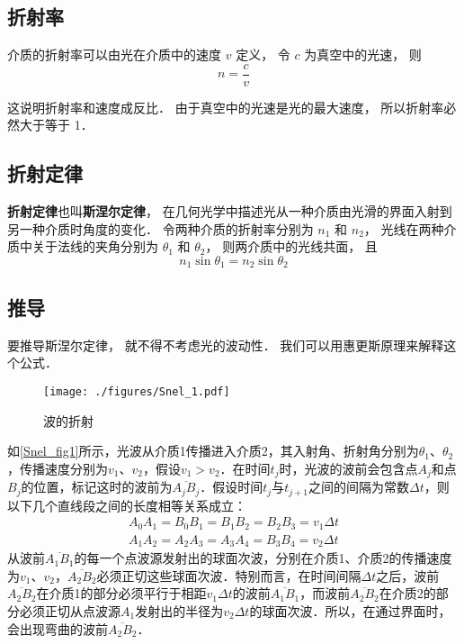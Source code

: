 
\subsection{折射率}
介质的折射率可以由光在介质中的速度 $v$ 定义， 令 $c$ 为真空中的光速， 则
\begin{equation}
n = \frac{c}{v}
\end{equation} 

这说明折射率和速度成反比． 由于真空中的光速是光的最大速度， 所以折射率必然大于等于 1．

\subsection{折射定律}

\textbf{折射定律}也叫\textbf{斯涅尔定律}， 在几何光学中描述光从一种介质由光滑的界面入射到另一种介质时角度的变化． 令两种介质的折射率分别为 $n_1$ 和 $n_2$， 光线在两种介质中关于法线的夹角分别为 $\theta_1$ 和 $\theta_2$， 则两介质中的光线共面， 且
\begin{equation}
n_1 \sin\theta_1 = n_2 \sin\theta_2
\end{equation}


\subsection{推导}
要推导斯涅尔定律， 就不得不考虑光的波动性． 我们可以用惠更斯原理来解释这个公式．
\begin{figure}[ht]
\centering
\texttt{[image: ./figures/Snel\_1.pdf]}
\caption{波的折射} \label{Snel_fig1}
\end{figure}
如\autoref{Snel_fig1}所示，光波从介质1传播进入介质2，其入射角、折射角分别为$\theta_1$、$\theta_2$，传播速度分别为$v_1$、$v_2$，假设$v_1>v_2$．在时间$t_{j}$时，光波的波前会包含点$A_{j}$和点$B_{j}$的位置，标记这时的波前为$\overline {A_{j}B_{j}}$．假设时间$t_{j}$与$t_{{j+1}}$之间的间隔为常数$\Delta t$，则以下几个直线段之间的长度相等关系成立：
\begin{equation}
\begin{aligned}
A_{0}A_{1}=B_{0}B_{1}=B_{1}B_{2}=B_{2}B_{3}=v_{1}\Delta t \\
A_{1}A_{2}=A_{2}A_{3}=A_{3}A_{4}=B_{3}B_{4}=v_{2}\Delta t
\end{aligned}
\end{equation}
从波前$\overline {A_{1}B_{1}}$的每一个点波源发射出的球面次波，分别在介质1、介质2的传播速度为$v_1$、$v_2$，$\overline {A_{2}B_{2}}$必须正切这些球面次波．特别而言，在时间间隔$\Delta t$之后，波前$\overline {A_{2}B_{2}}$在介质1的部分必须平行于相距$v_{1}\Delta t$的波前$\overline {A_{1}B_{1}}$，而波前$\overline {A_{2}B_{2}}$在介质2的部分必须正切从点波源$A_{1}$发射出的半径为$v_{2}\Delta t$的球面次波．所以，在通过界面时，会出现弯曲的波前$\overline {A_{2}B_{2}}$．

